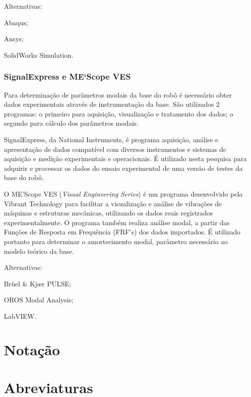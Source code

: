 Alternativas:
%
\begin{enumerate*}
	\item Abaqus;
	\item Ansys;
	\item SolidWorks Simulation.
\end{enumerate*}


\subsubsection{SignalExpress e ME`Scope VES}

Para determinação de parâmetros modais da base do robô é necessário obter dados
experimentais através de instrumentação da base. São utilizados 2 programas: o
primeiro para aquisição, visualização e tratamento dos dados; o segundo para
cálculo dos parâmetros modais.

SignalExpress\cite{signalexpress}, da National Instruments, é programa
aquisição, análise e apresentação de dados compatível com diversos instrumentos e sistemas de
aquisição e medição experimentais e operacionais. 
É utilizado nesta pesquisa para adquirir e processar os dados do ensaio
experimental de uma versão de testes da base do robô.

O ME'Scope VES (\textit{Visual Engineering Series})\cite{mescope} é um programa
desenvolvido pela Vibrant Technology para facilitar a visualização e análise de
vibrações de máquinas e estruturas mecânicas, utilizando os dados reais
registrados experimentalmente. O programa também realiza análise modal, a partir
das Funções de Resposta em Frequência (FRF's) dos dados importados. É utilizado
portanto para  determinar o amortecimento modal, parâmetro necessário ao modelo
teórico da base.

Alternativas:
%
\begin{enumerate*}
	\item Brüel \& Kjær PULSE;
	\item OROS Modal Analysis;
	\item LabVIEW.
\end{enumerate*}

\section{Notação}

\section{Abreviaturas}

